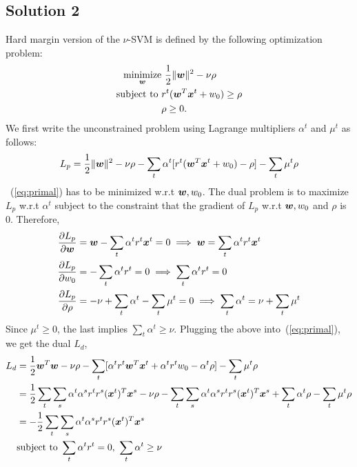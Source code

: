 \subsection*{Solution 2}
Hard margin version of the $\nu$-SVM is defined by the following optimization problem:
\begin{align*}
	\operatorname*{minimize}_{\boldsymbol{w}} &\ \frac{1}{2} \Vert \boldsymbol{w} \Vert^2 -\nu\rho\\ 
	\text{subject to } &r^t(\boldsymbol{w}^T\boldsymbol{x}^t + w_0) \geq \rho\\
	& \rho \geq 0.
\end{align*}
We first write the unconstrained problem using Lagrange multipliers $\alpha^t$ and $\mu^t$ as follows:
\begin{equation}\label{eq:primal}
	\begin{split}
		L_p = \frac{1}{2} \Vert \boldsymbol{w} \Vert^2 - \nu \rho - \sum_t \alpha^t[r^t(\boldsymbol{w}^T\boldsymbol{x}^t + w_0)-\rho] - \sum_t \mu^t \rho
	\end{split}
\end{equation}
~(\ref{eq:primal}) has to be minimized w.r.t $\boldsymbol{w}, w_0$. The dual problem is to maximize $L_p$ w.r.t $\alpha^t$ subject to the constraint that the gradient of $L_p$ w.r.t $\boldsymbol{w}, w_0$ and $\rho$ is $0$. Therefore,
\begin{equation}\label{eq:deri}
	\begin{split}
		\frac{\partial L_p}{\partial \boldsymbol{w}} &= \boldsymbol{w} - \sum_t \alpha^t r^t \boldsymbol{x}^t = 0 \implies \boldsymbol{w} = \sum_t \alpha^t r^t \boldsymbol{x}^t\\
		\frac{\partial L_p}{\partial w_0} &= -\sum_t \alpha^t r^t = 0 \implies \sum_t \alpha^t r^t = 0\\
		\frac{\partial L_p}{\partial \rho} &= -\nu + \sum_t \alpha^t - \sum_t \mu^t = 0 \implies \sum_t \alpha^t = \nu + \sum_t \mu^t
	\end{split}
\end{equation}
Since $\mu^t \geq 0$, the last implies $\sum_t \alpha^t \geq \nu$. Plugging the above into~(\ref{eq:primal}), we get the dual $L_d$,
\begin{equation}
	\begin{split}
		L_d &= \frac{1}{2} \boldsymbol{w}^T\boldsymbol{w} - \nu \rho -\sum_t[\alpha^tr^t\boldsymbol{w}^T\boldsymbol{x}^t+\alpha^tr^tw_0-\alpha^t\rho] - \sum_t\mu^t\rho\\
		&= \frac{1}{2}\sum_t\sum_s \alpha^t \alpha^s r^t r^s (\boldsymbol{x}^t)^T\boldsymbol{x}^s - \nu\rho - \sum_t\sum_s\alpha^t\alpha^s r^tr^s (\boldsymbol{x}^t)^T\boldsymbol{x}^s +\sum_t \alpha^t\rho - \sum_t\mu^t\rho\\
		&= -\frac{1}{2}\sum_t\sum_s \alpha^t \alpha^s r^t r^s (\boldsymbol{x}^t)^T\boldsymbol{x}^s\\
		&\text{subject to }\sum_t\alpha^tr^t = 0,\ \sum_t \alpha^t \geq \nu
	\end{split}
\end{equation}